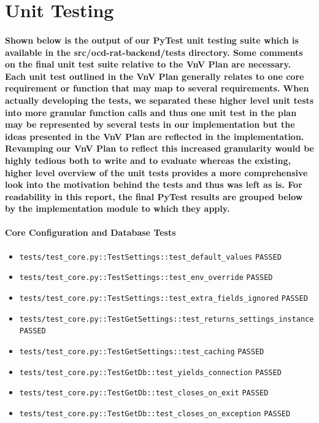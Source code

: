 \documentclass[12pt, titlepage]{article}
\begin{document}
\section{Unit Testing}

\paragraph{Shown below is the output of our PyTest unit testing suite which is available in the src/ocd-rat-backend/tests directory. Some comments on
the final unit test suite relative to the VnV Plan are necessary. Each unit test outlined in the VnV Plan generally relates to one core requirement
or function that may map to several requirements. When actually developing the tests, we separated these higher level unit tests into more granular
function calls and thus one unit test in the plan may be represented by several tests in our implementation but the ideas presented in the VnV Plan
are reflected in the implementation. Revamping our VnV Plan to reflect this increased granularity would be highly tedious both to write and to evaluate
whereas the existing, higher level overview of the unit tests provides a more comprehensive look into the motivation behind the tests and thus was
left as is. For readability in this report, the final PyTest results are grouped below by the implementation module to which they apply.}

\paragraph{Core Configuration and Database Tests}
{\small
\begin{itemize}[leftmargin=1.5em, itemsep=0.2em, topsep=0.3em]
  \item \nolinkurl{tests/test_core.py::TestSettings::test_default_values} \texttt{PASSED}
  \item \nolinkurl{tests/test_core.py::TestSettings::test_env_override} \texttt{PASSED}
  \item \nolinkurl{tests/test_core.py::TestSettings::test_extra_fields_ignored} \texttt{PASSED}
  \item \nolinkurl{tests/test_core.py::TestGetSettings::test_returns_settings_instance} \texttt{PASSED}
  \item \nolinkurl{tests/test_core.py::TestGetSettings::test_caching} \texttt{PASSED}
  \item \nolinkurl{tests/test_core.py::TestGetDb::test_yields_connection} \texttt{PASSED}
  \item \nolinkurl{tests/test_core.py::TestGetDb::test_closes_on_exit} \texttt{PASSED}
  \item \nolinkurl{tests/test_core.py::TestGetDb::test_closes_on_exception} \texttt{PASSED}
\end{itemize}
}
\end{document}
